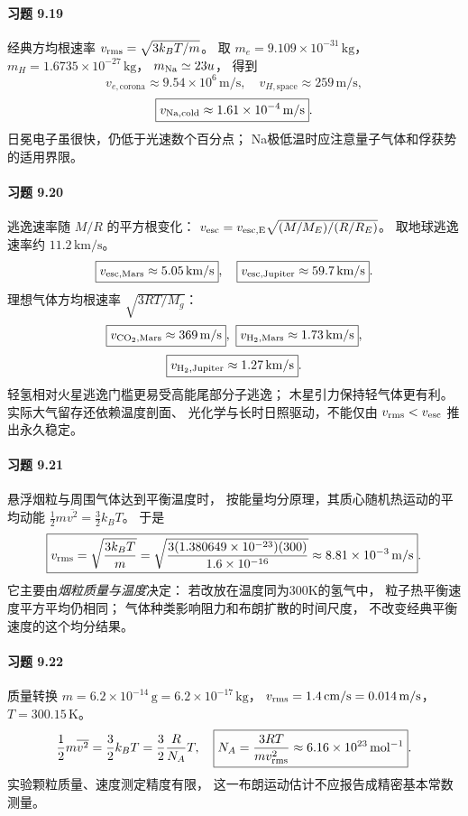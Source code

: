 \paragraph{习题 9.19}
经典方均根速率
\(v_{\rm rms}=\sqrt{3k_BT/m}\)。
取 \(m_e=9.109\times10^{-31}\,\mathrm{kg}\)，
\(m_H=1.6735\times10^{-27}\,\mathrm{kg}\)，
\(m_{\rm Na}\simeq23u\)，
得到
\[
 \boxed{v_{e,\mathrm{corona}}\approx9.54\times10^6\,\mathrm{m/s}},
\quad
 \boxed{v_{H,\mathrm{space}}\approx259\,\mathrm{m/s}},
\]
\[
 \boxed{v_{\rm Na,cold}\approx1.61\times10^{-4}\,\mathrm{m/s}}.
\]
日冕电子虽很快，仍低于光速数个百分点；
Na极低温时应注意量子气体和俘获势的适用界限。

\paragraph{习题 9.20}
逃逸速率随 \(M/R\) 的平方根变化：
\(v_{\rm esc}=v_{\rm esc,E}
 \sqrt{(M/M_E)/(R/R_E)}\)。
取地球逃逸速率约 \(11.2\,\mathrm{km/s}\)。
\[
 \boxed{v_{\rm esc,Mars}\approx5.05\,\mathrm{km/s}},
\quad
 \boxed{v_{\rm esc,Jupiter}\approx59.7\,\mathrm{km/s}}.
\]
理想气体方均根速率
\(\sqrt{3RT/M_g}\)：
\[
 \boxed{v_{\rm CO_2,Mars}\approx369\,\mathrm{m/s}},\
 \boxed{v_{\rm H_2,Mars}\approx1.73\,\mathrm{km/s}},
\]
\[
 \boxed{v_{\rm H_2,Jupiter}\approx1.27\,\mathrm{km/s}}.
\]
轻氢相对火星逃逸门槛更易受高能尾部分子逃逸；
木星引力保持轻气体更有利。
实际大气留存还依赖温度剖面、
光化学与长时日照驱动，不能仅由
\(v_{\rm rms}<v_{\rm esc}\) 推出永久稳定。


\paragraph{习题 9.21}
悬浮烟粒与周围气体达到平衡温度时，
按能量均分原理，其质心随机热运动的平均动能
\(\frac12m\overline{v^2}=\frac32k_BT\)。
于是
\[
 \boxed{v_{\rm rms}=\sqrt{\frac{3k_BT}{m}}
 =\sqrt{\frac{3(1.380649\times10^{-23})(300)}
 {1.6\times10^{-16}}}
 \approx8.81\times10^{-3}\,\mathrm{m/s}}.
\]
它主要由\emph{烟粒质量与温度}决定：
若改放在温度同为300K的氢气中，
粒子热平衡速度平方平均仍相同；
气体种类影响阻力和布朗扩散的时间尺度，
不改变经典平衡速度的这个均分结果。

\paragraph{习题 9.22}
质量转换
\(m=6.2\times10^{-14}\,\mathrm g
 =6.2\times10^{-17}\,\mathrm{kg}\)，
\(v_{\rm rms}=1.4\,\mathrm{cm/s}
 =0.014\,\mathrm{m/s}\)，
\(T=300.15\,\mathrm K\)。
\[
 \frac12m\overline{v^2}
 =\frac32k_BT
 =\frac32\frac R{N_A}T,
\quad
 \boxed{N_A=\frac{3RT}{mv_{\rm rms}^2}
 \approx6.16\times10^{23}\,\mathrm{mol^{-1}}}.
\]
实验颗粒质量、速度测定精度有限，
这一布朗运动估计不应报告成精密基本常数测量。

